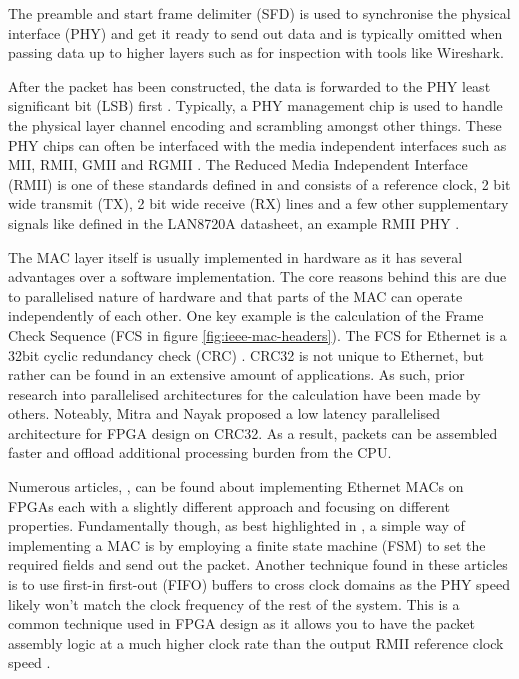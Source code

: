 The preamble and start frame delimiter (SFD) is used to synchronise the physical interface (PHY) and get it ready to send out data and is typically omitted when passing data up to higher layers such as for inspection with tools like Wireshark.

After the packet has been constructed, the data is forwarded to the PHY least significant bit (LSB) first \cite{IEEE802.3-2012}. Typically, a PHY management chip is used to handle the physical layer channel encoding and scrambling amongst other things. 
These PHY chips can often be interfaced with the media independent interfaces such as MII, RMII, GMII and RGMII \cite{OptimisedEthernetMAC}. The Reduced Media Independent Interface (RMII) is one of these standards defined in \cite{IEEE802.3-2012} and consists of a reference clock, 2 bit wide transmit (TX), 2 bit wide receive (RX) lines and a few other supplementary signals like defined in the LAN8720A datasheet, an example RMII PHY \cite{LAN8720ADatasheet}.


The MAC layer itself is usually implemented in hardware as it has several advantages over a software implementation. The core reasons behind this are due to parallelised nature of hardware and that parts of the MAC can operate independently \cite{reducedEtherentMacFPGA} of each other. One key example is the calculation of the Frame Check Sequence (FCS in figure \ref{fig:ieee-mac-headers}). The FCS for Ethernet is a 32bit cyclic redundancy check (CRC) \cite{IEEE802.3-2012}. CRC32 is not unique to Ethernet, but rather can be found in an extensive amount of applications. As such, prior research into parallelised architectures for the calculation have been made by others. Noteably, Mitra and Nayak \cite{ParallelCRC} proposed a low latency parallelised architecture for FPGA design on CRC32. As a result, packets can be assembled faster and offload additional processing burden from the CPU. 


Numerous articles, \cite{OptimisedEthernetMAC} \cite{EthernetAXI} \cite{EthernetRMII}, can be found about implementing Ethernet MACs 
on FPGAs each with a slightly different approach and focusing on different properties. Fundamentally though, as best highlighted in \cite{OptimisedEthernetMAC}, a simple way of implementing a MAC is by employing a finite state machine (FSM) to set the required fields and send out the packet. Another technique found in these articles is to use first-in first-out (FIFO) buffers to cross clock domains as the PHY speed likely won't match the clock frequency of the rest of the system. This is a common technique used in FPGA design as it allows you to have the packet assembly logic at a much higher clock rate than the output RMII reference clock speed \cite{EthernetAXI}. 


